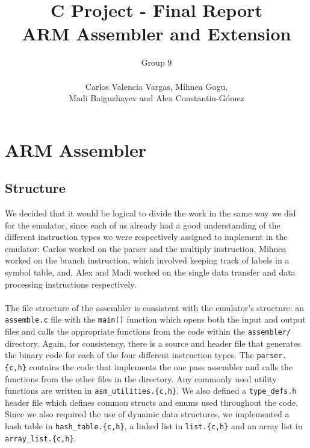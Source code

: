 \documentclass[11pt]{article}
\begin{document}
\setcounter{secnumdepth}{2}

\title{
  C Project - Final Report \\
  \large ARM Assembler and Extension}
\author{Group 9\\\\Carlos Valencia Vargas, Mihnea Gogu,\\Madi Baiguzhayev and Alex Constantin-G\'omez}

\maketitle

\section{ARM Assembler}
\subsection{Structure}
We decided that it would be logical to divide the work in the same way we did for the emulator, since each of us already had a good understanding of the different instruction types we were respectively assigned to implement in the emulator: Carlos worked on the parser and the multiply instruction, Mihnea worked on the branch instruction, which involved keeping track of labels in a symbol table, and, Alex and Madi worked on the single data transfer and data processing instructions respectively.
\\\\
The file structure of the assembler is consistent with the emulator's structure: an \texttt{assemble.c} file with the \texttt{main()} function which opens both the input and output files and calls the appropriate functions from the code within the \texttt{assembler/} directory. Again, for consistency, there is a source and header file that generates the binary code for each of the four different instruction types. The \texttt{parser.\{c,h\}} contains the code that implements the one pass assembler and calls the functions from the other files in the directory. Any commonly used utility functions are written in \texttt{asm\_utilities.\{c,h\}}. We also defined a \texttt{type\_defs.h} header file which defines common structs and enums used throughout the code. Since we also required the use of dynamic data structures, we implemented a hash table in \texttt{hash\_table.\{c,h\}}, a linked list in \texttt{list.\{c,h\}} and an array list in \texttt{array\_list.\{c,h\}}.
\end{document}
